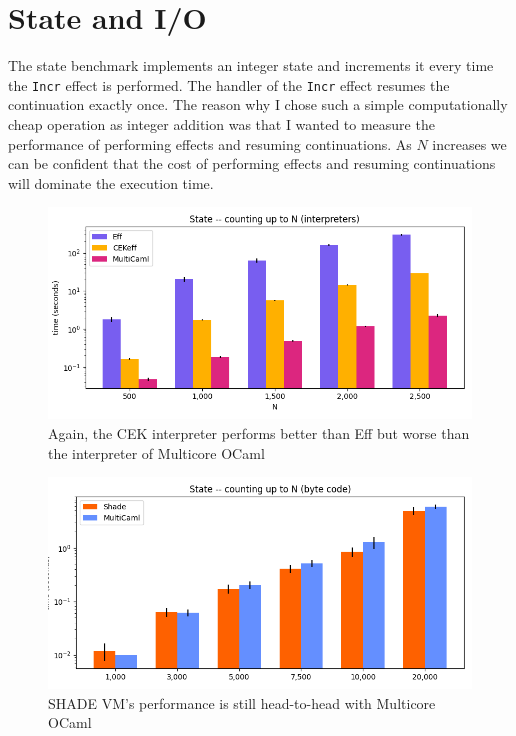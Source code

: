\documentclass[class=article, crop=false]{standalone}
\begin{document}
\section{State and I/O}

The state benchmark implements an integer state and increments it every time the
\verb|Incr| effect is performed. The handler of the \verb|Incr| effect resumes
the continuation exactly once. The reason why I chose such a simple
computationally cheap operation as integer addition was that I wanted to measure
the performance of performing effects and resuming continuations. As $N$
increases we can be confident that the cost of performing effects and resuming
continuations will dominate the execution time.

\begin{figure}
    \centering
    \includegraphics[width=35em]{eval_plots/interp_state.png}
    \caption{Again, the CEK interpreter performs better than Eff but worse than
    the interpreter of Multicore OCaml}
    \label{fig:state-interpreters}
\end{figure}

\begin{figure}
    \centering
    \includegraphics[width=35em]{eval_plots/comp_state.png}
    \caption{SHADE VM's performance is still head-to-head with Multicore OCaml}
    \label{fig:state-bytecode}
\end{figure}
\end{document}
